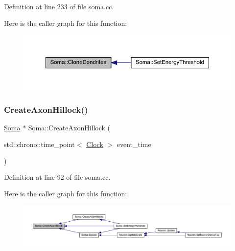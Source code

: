 Definition at line 233 of file soma.\+cc.

Here is the caller graph for this function\+:
\nopagebreak
\begin{figure}[H]
\begin{center}
\leavevmode
\includegraphics[width=350pt]{class_soma_a3975212d2e3d8675ca14fbc9879e5e54_icgraph}
\end{center}
\end{figure}
\mbox{\label{class_soma_a42289635de3cb326bceeb5358b99c190}} 
\subsubsection{\texorpdfstring{Create\+Axon\+Hillock()}{CreateAxonHillock()}}
{\footnotesize\ttfamily \hyperlink{class_soma}{Soma} $\ast$ Soma\+::\+Create\+Axon\+Hillock (\begin{DoxyParamCaption}\item[{std\+::chrono\+::time\+\_\+point$<$ \hyperlink{universe_8h_a0ef8d951d1ca5ab3cfaf7ab4c7a6fd80}{Clock} $>$}]{event\+\_\+time }\end{DoxyParamCaption})}



Definition at line 92 of file soma.\+cc.

Here is the caller graph for this function\+:
\nopagebreak
\begin{figure}[H]
\begin{center}
\leavevmode
\includegraphics[width=350pt]{class_soma_a42289635de3cb326bceeb5358b99c190_icgraph}
\end{center}
\end{figure}
\mbox{\label{class_soma_ab059a6d4a7dc41664d6d17794d09b260}} 
